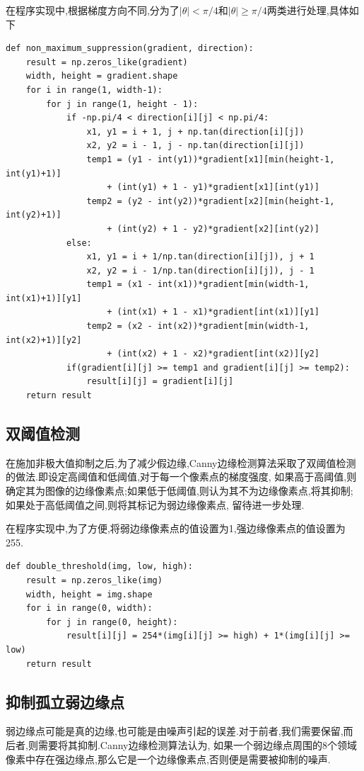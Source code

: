\documentclass[a4paper]{article}
\begin{document}
在程序实现中,根据梯度方向不同,分为了$|\theta|<\pi/4$和$|\theta|\geq \pi/4$两类进行处理,具体如下

\begin{verbatim}
def non_maximum_suppression(gradient, direction):
    result = np.zeros_like(gradient)
    width, height = gradient.shape
    for i in range(1, width-1):
        for j in range(1, height - 1):
            if -np.pi/4 < direction[i][j] < np.pi/4:
                x1, y1 = i + 1, j + np.tan(direction[i][j])
                x2, y2 = i - 1, j - np.tan(direction[i][j])
                temp1 = (y1 - int(y1))*gradient[x1][min(height-1, int(y1)+1)]
                    + (int(y1) + 1 - y1)*gradient[x1][int(y1)]
                temp2 = (y2 - int(y2))*gradient[x2][min(height-1, int(y2)+1)]
                    + (int(y2) + 1 - y2)*gradient[x2][int(y2)]
            else:
                x1, y1 = i + 1/np.tan(direction[i][j]), j + 1
                x2, y2 = i - 1/np.tan(direction[i][j]), j - 1
                temp1 = (x1 - int(x1))*gradient[min(width-1, int(x1)+1)][y1] 
                    + (int(x1) + 1 - x1)*gradient[int(x1)][y1]
                temp2 = (x2 - int(x2))*gradient[min(width-1, int(x2)+1)][y2]
                    + (int(x2) + 1 - x2)*gradient[int(x2)][y2]
            if(gradient[i][j] >= temp1 and gradient[i][j] >= temp2):
                result[i][j] = gradient[i][j]
    return result
\end{verbatim}

        \subsection{双阈值检测}
        \label{double_threshold}
在施加非极大值抑制之后,为了减少假边缘,Canny边缘检测算法采取了双阈值检测的做法.即设定高阈值和低阈值,对于每一个像素点的梯度强度,
如果高于高阈值,则确定其为图像的边缘像素点;如果低于低阈值,则认为其不为边缘像素点,将其抑制;如果处于高低阈值之间,则将其标记为弱边缘像素点,
留待进一步处理.

在程序实现中,为了方便,将弱边缘像素点的值设置为1,强边缘像素点的值设置为255.

\begin{verbatim}
def double_threshold(img, low, high):
    result = np.zeros_like(img)
    width, height = img.shape
    for i in range(0, width):
        for j in range(0, height):
            result[i][j] = 254*(img[i][j] >= high) + 1*(img[i][j] >= low)
    return result
\end{verbatim}

    \subsection{抑制孤立弱边缘点}
弱边缘点可能是真的边缘,也可能是由噪声引起的误差.对于前者,我们需要保留,而后者,则需要将其抑制.Canny边缘检测算法认为,
如果一个弱边缘点周围的8个领域像素中存在强边缘点,那么它是一个边缘像素点,否则便是需要被抑制的噪声.
\end{document}
